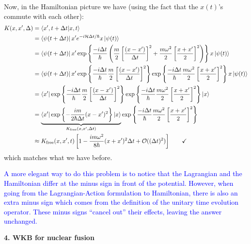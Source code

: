 \documentclass{article}
\theoremstyle{definition}
\newcommand{\ham}{\mathcal{H}}
\newcommand{\f}[2]{\frac{#1}{#2}}
\newcommand{\lp}{\left(}
\newcommand{\rp}{\right)}
\newcommand{\lb}{\left[}
\newcommand{\rb}{\right]}
\newcommand{\lc}{\left\{}
\newcommand{\rc}{\right\}}
\begin{document}
\begin{enumerate}[label=(\alph*)]
	Now, in the Hamiltonian picture we have (using the fact that the $x(t)$'s commute with each other):
	\begin{align*}
	K(x,x',\Delta) 
	&= \bra{x',t + \Delta t}\ket{x,t} \\
	&= \bra{\psi(t+\Delta t)} x' e^{-i \ham \Delta t / \hbar}  x \ket{\psi(t)}\\
	&= \bra{\psi(t+\Delta t)} x' \exp\lc \f{-i \Delta t }{ \hbar} \lp \f{m}{2}\lb \f{(x - x')}{\Delta t} \rb^2 + \f{m\omega^2}{2}\lb \f{x + x'}{2} \rb^2 \rp \rc x \ket{\psi(t)}\\
	&= \bra{\psi(t+\Delta t)} x' \exp\lc \f{-i \Delta t }{ \hbar}  \f{m}{2}\lb \f{(x - x')}{\Delta t} \rb^2\rc  \exp\lc  \f{-i \Delta t }{ \hbar} \f{m\omega^2}{2}\lb \f{x + x'}{2} \rb^2  \rc  x \ket{\psi(t)}\\
	&= \bra{x'} \exp\lc \f{-i \Delta t }{ \hbar}  \f{m}{2}\lb \f{(x - x')}{\Delta t} \rb^2\rc  \exp\lc  \f{-i \Delta t }{ \hbar} \f{m\omega^2}{2}\lb \f{x + x'}{2} \rb^2  \rc \ket{x}\\
	&= \underbrace{\bra{x'} \exp\lc -\f{im}{2\hbar\Delta t }(x- x')^2\rc   \ket{x}}_{K_\text{free}(x,x',\Delta t) }\exp\lc  \f{-i \Delta t }{ \hbar} \f{m\omega^2}{2}\lb \f{x + x'}{2} \rb^2  \rc\\
	&\approx K_\text{free}(x,x',t)\lb 1 -   \f{i m\omega^2}{8\hbar} (x + x')^2 \Delta t + \mathcal{O}((\Delta t)^2) \rb \quad\quad \checkmark
	\end{align*}
	which matches what we have before. 
	
	
	\textcolor{blue}{A more elegant way to do this problem is to notice that the Lagrangian and the Hamiltonian differ at the minus sign in front of the potential. However, when going from the Lagrangian-Action formulation to Hamiltonian, there is also an extra minus sign which comes from the definition of the unitary time evolution operator. These minus signs ``cancel out'' their effects, leaving the answer unchanged.}
\end{enumerate}	



\noindent \textbf{4. WKB for nuclear fusion}
\end{document}
